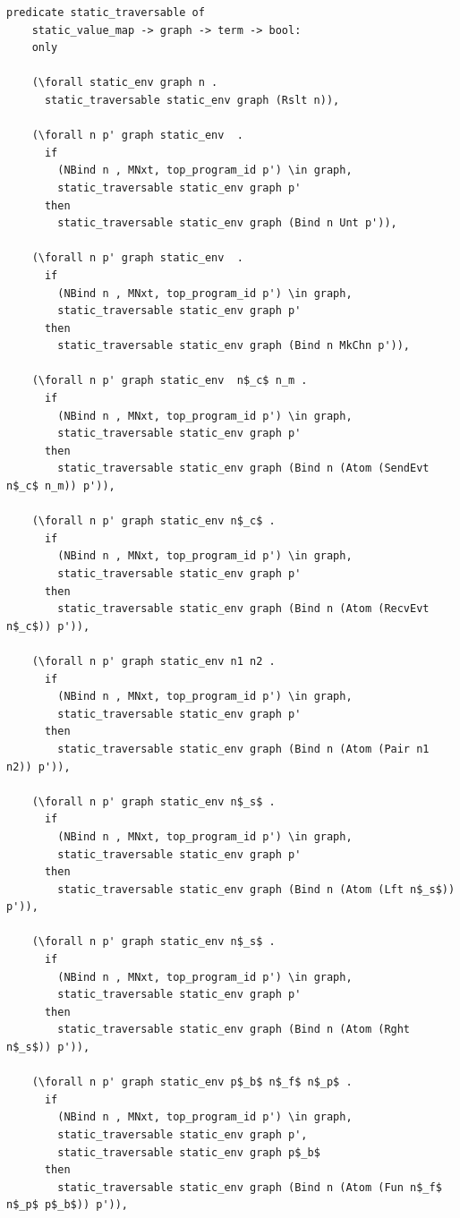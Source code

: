 \documentclass[10pt]{article}
\begin{document}
\begin{lstlisting}[language=logic, mathescape]
  predicate static_traversable of
    static_value_map -> graph -> term -> bool:
    only

    (\forall static_env graph n .
      static_traversable static_env graph (Rslt n)),

    (\forall n p' graph static_env  .
      if
        (NBind n , MNxt, top_program_id p') \in graph,
        static_traversable static_env graph p'
      then
        static_traversable static_env graph (Bind n Unt p')),

    (\forall n p' graph static_env  .
      if
        (NBind n , MNxt, top_program_id p') \in graph,
        static_traversable static_env graph p'
      then
        static_traversable static_env graph (Bind n MkChn p')),

    (\forall n p' graph static_env  n$_c$ n_m .
      if
        (NBind n , MNxt, top_program_id p') \in graph, 
        static_traversable static_env graph p'
      then
        static_traversable static_env graph (Bind n (Atom (SendEvt n$_c$ n_m)) p')),

    (\forall n p' graph static_env n$_c$ .
      if
        (NBind n , MNxt, top_program_id p') \in graph,
        static_traversable static_env graph p'
      then
        static_traversable static_env graph (Bind n (Atom (RecvEvt n$_c$)) p')),

    (\forall n p' graph static_env n1 n2 .
      if
        (NBind n , MNxt, top_program_id p') \in graph,
        static_traversable static_env graph p'
      then
        static_traversable static_env graph (Bind n (Atom (Pair n1 n2)) p')),

    (\forall n p' graph static_env n$_s$ .
      if
        (NBind n , MNxt, top_program_id p') \in graph,
        static_traversable static_env graph p'
      then
        static_traversable static_env graph (Bind n (Atom (Lft n$_s$)) p')),

    (\forall n p' graph static_env n$_s$ .
      if
        (NBind n , MNxt, top_program_id p') \in graph,
        static_traversable static_env graph p'
      then
        static_traversable static_env graph (Bind n (Atom (Rght n$_s$)) p')),

    (\forall n p' graph static_env p$_b$ n$_f$ n$_p$ .
      if
        (NBind n , MNxt, top_program_id p') \in graph,
        static_traversable static_env graph p', 
        static_traversable static_env graph p$_b$
      then
        static_traversable static_env graph (Bind n (Atom (Fun n$_f$ n$_p$ p$_b$)) p')),


\end{lstlisting}
\end{document}
